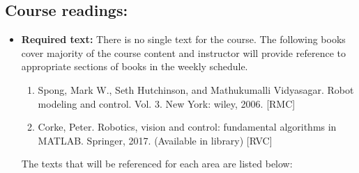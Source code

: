 \documentclass[a4paper,11pt]{article}
\begin{document}
\subsection*{Course readings:}
\begin{itemize}
\item \textbf{Required text:} There is no single text for the course. The following books cover majority of the course content and instructor will provide reference to appropriate sections of books in the weekly schedule. 
\begin{enumerate}[label=(\alph*)]
	\item Spong, Mark W., Seth Hutchinson, and Mathukumalli Vidyasagar. Robot modeling and control. Vol. 3. New York: wiley, 2006. [RMC]	
	\item Corke, Peter. Robotics, vision and control: fundamental algorithms in MATLAB. Springer, 2017. (Available in library) [RVC] 
\end{enumerate}

The texts that will be referenced for each area are listed below:\\


\end{itemize}
\end{document}
